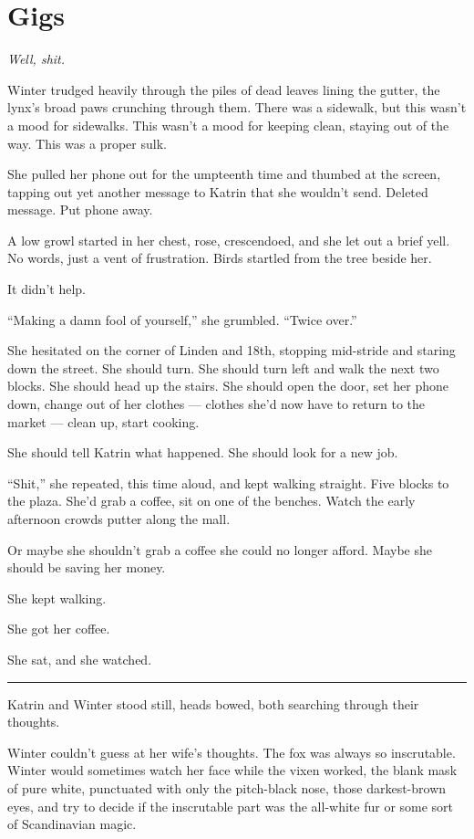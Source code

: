 \chapter{Gigs}

\emph{Well, shit.}

Winter trudged heavily through the piles of dead leaves lining the gutter, the lynx's broad paws crunching through them. There was a sidewalk, but this wasn't a mood for sidewalks. This wasn't a mood for keeping clean, staying out of the way. This was a proper sulk.

She pulled her phone out for the umpteenth time and thumbed at the screen, tapping out yet another message to Katrin that she wouldn't send. Deleted message. Put phone away.

A low growl started in her chest, rose, crescendoed, and she let out a brief yell. No words, just a vent of frustration. Birds startled from the tree beside her.

It didn't help.

``Making a damn fool of yourself,'' she grumbled. ``Twice over.''

She hesitated on the corner of Linden and 18th, stopping mid-stride and staring down the street. She should turn. She should turn left and walk the next two blocks. She should head up the stairs. She should open the door, set her phone down, change out of her clothes --- clothes she'd now have to return to the market --- clean up, start cooking.

She should tell Katrin what happened. She should look for a new job.

``Shit,'' she repeated, this time aloud, and kept walking straight. Five blocks to the plaza. She'd grab a coffee, sit on one of the benches. Watch the early afternoon crowds putter along the mall.

Or maybe she shouldn't grab a coffee she could no longer afford. Maybe she should be saving her money.

She kept walking.

She got her coffee.

She sat, and she watched.

\begin{center}\rule{0.5\linewidth}{0.5pt}\end{center}

Katrin and Winter stood still, heads bowed, both searching through their thoughts.

Winter couldn't guess at her wife's thoughts. The fox was always so inscrutable. Winter would sometimes watch her face while the vixen worked, the blank mask of pure white, punctuated with only the pitch-black nose, those darkest-brown eyes, and try to decide if the inscrutable part was the all-white fur or some sort of Scandinavian magic.


